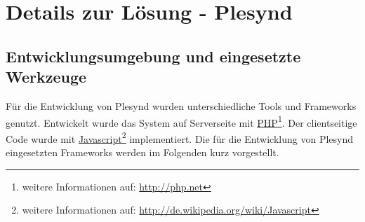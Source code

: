 \chapter{Details zur Lösung - Plesynd} 
\label{chapter:Kapitel6}

\section{Entwicklungsumgebung und eingesetzte Werkzeuge}\label{section:entwicklungsumgebungen_tools}
Für die Entwicklung von Plesynd wurden unterschiedliche Tools und Frameworks genutzt. Entwickelt wurde das System auf Serverseite mit \href{http://php.net}{PHP}\footnote{weitere Informationen auf: \url{http://php.net}}. Der clientseitige Code wurde mit \href{http://de.wikipedia.org/wiki/Javascript}{Javascript}\footnote{weitere Informationen auf: \url{http://de.wikipedia.org/wiki/Javascript}} implementiert. Die für die Entwicklung von Plesynd eingesetzten Frameworks werden im Folgenden kurz vorgestellt.

